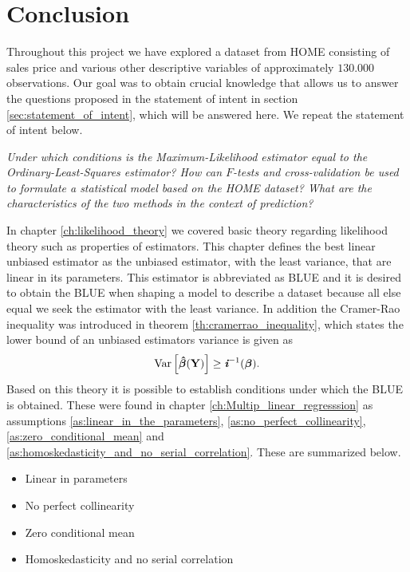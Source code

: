 \chapter{Conclusion}\label{ch:conclusion}
Throughout this project we have explored a dataset from HOME consisting of sales price and various other descriptive variables of approximately $130.000$ observations. Our goal was to obtain crucial knowledge that allows us to answer the questions proposed in the statement of intent in section \ref{sec:statement_of_intent}, which will be answered here. We repeat the statement of intent below. 

\textit{Under which conditions is the Maximum-Likelihood estimator equal to the Ordinary-Least-Squares estimator?
How can $F$-tests and cross-validation be used to formulate a statistical model based on the HOME dataset?
What are the characteristics of the two methods in the context of prediction?}

In chapter \ref{ch:likelihood_theory} we covered basic theory regarding likelihood theory such as properties of estimators. 
This chapter defines the best linear unbiased estimator as the unbiased estimator, with the least variance, that are linear in its parameters.
This estimator is abbreviated as BLUE and it is desired to obtain the BLUE when shaping a model to describe a dataset because all else equal we seek the estimator with the least variance. 
In addition the Cramer-Rao inequality was introduced in theorem \ref{th:cramerrao_inequality}, which states the lower bound of an unbiased estimators variance is given as
\begin{align*} 
    \operatorname{\text{Var}} \Big[ \boldsymbol{\hat{\beta}}(\textbf{Y})\Big] \geq \textit{\textbf{i}}^{-1}(\boldsymbol{\beta}).
\end{align*}
Based on this theory it is possible to establish conditions under which the BLUE is obtained. 
These were found in chapter \ref{ch:Multip_linear_regresssion} as assumptions \ref{as:linear_in_the_parameters}, \ref{as:no_perfect_collinearity}, \ref{as:zero_conditional_mean} and \ref{as:homoskedasticity_and_no_serial_correlation}.
These are summarized below.
\begin{itemize}
    \item Linear in parameters
    \item No perfect collinearity
    \item Zero conditional mean
    \item Homoskedasticity and no serial correlation
\end{itemize}


